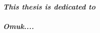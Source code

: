 \clearpage
\vspace*{\fill}
\begin{center}
\textbf{\textit{\huge{This thesis is dedicated to \\}}}
\textbf{\textit{\huge{\\Omuk....}}}
\end{center}
\vfill %